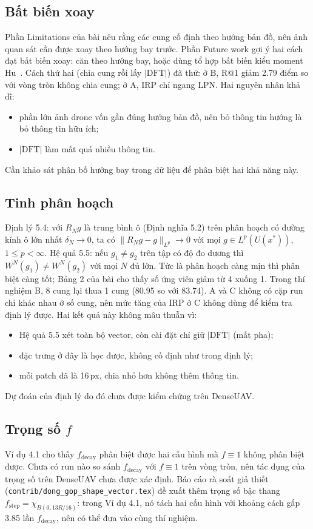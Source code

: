 \documentclass[11pt,a4paper]{article}
\begin{document}
\subsection{Bất biến xoay}
Phần Limitations của bài nêu rằng các cung cố định theo hướng bản đồ, nên ảnh quan sát cần được xoay theo hướng bay trước. Phần Future work gợi ý hai cách đạt bất biến xoay: căn theo hướng bay, hoặc dùng tổ hợp bất biến kiểu moment Hu~\cite{hu1962}. Cách thứ hai (chia cung rồi lấy $|\mathrm{DFT}|$) đã thử: ở B, R@1 giảm 2.79 điểm so với vòng tròn không chia cung; ở A, IRP chỉ ngang LPN. Hai nguyên nhân khả dĩ:
\begin{itemize}
\item phần lớn ảnh drone vốn gần đúng hướng bản đồ, nên bỏ thông tin hướng là bỏ thông tin hữu ích;
\item $|\mathrm{DFT}|$ làm mất quá nhiều thông tin.
\end{itemize}
Cần khảo sát phân bố hướng bay trong dữ liệu để phân biệt hai khả năng này.

\subsection{Tinh phân hoạch}
Định lý 5.4: với $R_Ng$ là trung bình ô (Định nghĩa 5.2) trên phân hoạch có đường kính ô lớn nhất $\delta_N\to0$, ta có $\|R_Ng-g\|_{L^p}\to0$ với mọi $g\in L^p(U(x^*))$, $1\le p<\infty$. Hệ quả 5.5: nếu $g_1\ne g_2$ trên tập có độ đo dương thì $W^N(g_1)\ne W^N(g_2)$ với mọi $N$ đủ lớn. Tức là phân hoạch càng mịn thì phân biệt càng tốt; Bảng 2 của bài cho thấy số ứng viên giảm từ 4 xuống 1. Trong thí nghiệm B, 8 cung lại thua 1 cung (80.95 so với 83.74). A và C không có cặp run chỉ khác nhau ở số cung, nên mức tăng của IRP ở C không dùng để kiểm tra định lý được. Hai kết quả này không mâu thuẫn vì:
\begin{itemize}
\item Hệ quả 5.5 xét toàn bộ vector, còn cài đặt chỉ giữ $|\mathrm{DFT}|$ (mất pha);
\item đặc trưng ở đây là học được, không cố định như trong định lý;
\item mỗi patch đã là 16\,px, chia nhỏ hơn không thêm thông tin.
\end{itemize}
Dự đoán của định lý do đó chưa được kiểm chứng trên DenseUAV.

\subsection{Trọng số $f$}
Ví dụ 4.1 cho thấy $f_{\mathrm{decay}}$ phân biệt được hai cấu hình mà $f\equiv1$ không phân biệt được. Chưa có run nào so sánh $f_{\mathrm{decay}}$ với $f\equiv1$ trên vòng tròn, nên tác dụng của trọng số trên DenseUAV chưa được xác định. Báo cáo rà soát giả thiết (\texttt{contrib/dong\_gop\_shape\_vector.tex}) đề xuất thêm trọng số bậc thang $f_{\mathrm{step}}=\chi_{B(0,13R/16)}$: trong Ví dụ 4.1, nó tách hai cấu hình với khoảng cách gấp 3.85 lần $f_{\mathrm{decay}}$, nên có thể đưa vào cùng thí nghiệm.
\end{document}
